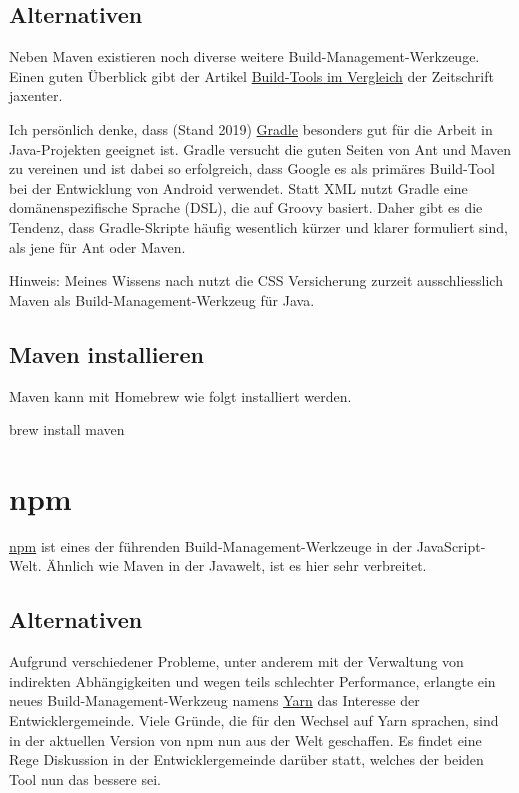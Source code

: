 \documentclass[]{article}
\begin{document}
\subsection{Alternativen}
Neben Maven existieren noch diverse weitere Build-Management-Werkzeuge. Einen guten Überblick gibt der Artikel \href{https://jaxenter.de/8-build-tools-im-vergleich-ant-buildr-maven-bazel-buck-gradle-pants-sbt-41627}{Build-Tools im Vergleich} der Zeitschrift jaxenter.

Ich persönlich denke, dass (Stand 2019) \href{https://gradle.org/}{Gradle} besonders gut für die Arbeit in Java-Projekten geeignet ist. Gradle versucht die guten Seiten von Ant und Maven zu vereinen und ist dabei so erfolgreich, dass Google es als primäres Build-Tool bei der Entwicklung von Android verwendet. Statt XML nutzt Gradle eine domänenspezifische Sprache (DSL), die auf Groovy basiert. Daher gibt es die Tendenz, dass Gradle-Skripte häufig wesentlich kürzer und klarer formuliert sind, als jene für Ant oder Maven.

Hinweis: Meines Wissens nach nutzt die CSS Versicherung zurzeit ausschliesslich Maven als Build-Management-Werkzeug für Java.

\subsection{Maven installieren}
Maven kann mit Homebrew wie folgt installiert werden.
\begin{bashcode}
brew install maven
\end{bashcode}



\section{npm}
\href{https://www.npmjs.com/}{npm} ist eines der führenden Build-Management-Werkzeuge in der JavaScript-Welt. Ähnlich wie Maven in der Javawelt, ist es hier sehr verbreitet. 

\subsection{Alternativen}
Aufgrund verschiedener Probleme, unter anderem mit der Verwaltung von indirekten Abhängigkeiten und wegen teils schlechter Performance, erlangte ein neues Build-Management-Werkzeug namens \href{https://yarnpkg.com}{Yarn} das Interesse der Entwicklergemeinde. Viele Gründe, die für den Wechsel auf Yarn sprachen, sind in der aktuellen Version von npm nun aus der Welt geschaffen. Es findet eine Rege Diskussion in der Entwicklergemeinde darüber statt, welches der beiden Tool nun das bessere sei.
\end{document}
